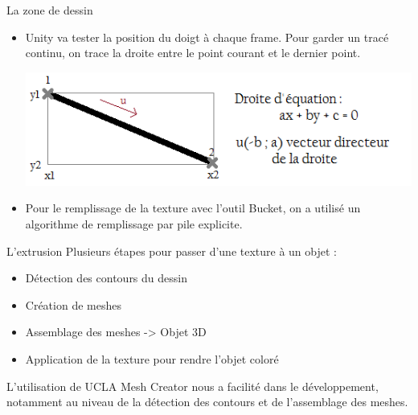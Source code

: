 \documentclass[a4paper,10pt]{beamer}
\begin{document}
	\begin{frame}{La zone de dessin}
		\begin{itemize}
		\item Unity va tester la position du doigt à chaque frame.
		Pour garder un tracé continu, on trace la droite entre le point courant et le dernier point.
		\centerline{\includegraphics[scale=0.2]{images/intro/trait.png}}
		
		\item Pour le remplissage de la texture avec l'outil Bucket, on a utilisé un algorithme de remplissage par pile explicite.
	\end{itemize}
	\end{frame}
	
	\begin{frame}{L'extrusion}
		Plusieurs étapes pour passer d'une texture à un objet :
		\begin{itemize}
			\item Détection des contours du dessin
			\item Création de meshes
			\item Assemblage des meshes -> Objet 3D
			\item Application de la texture pour rendre l'objet coloré
		\end{itemize}
		
		L'utilisation de UCLA Mesh Creator nous a facilité dans le développement, notamment au niveau de la détection des contours et de l'assemblage des meshes.
	\end{frame}
		
\end{document}

